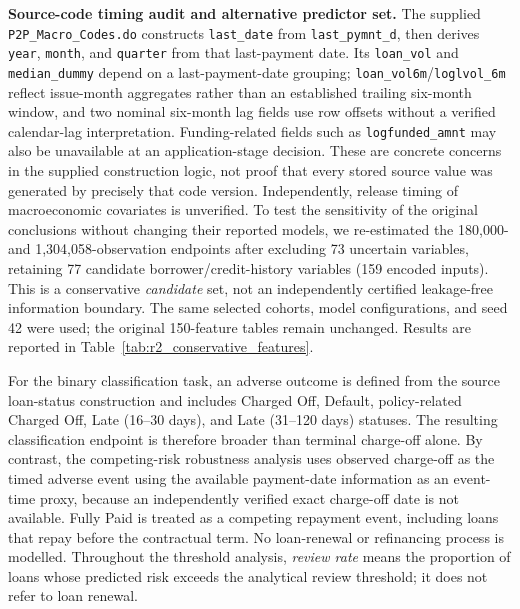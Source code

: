 \documentclass[10pt]{article}
\begin{document}
\noindent\textbf{Source-code timing audit and alternative predictor set.} The supplied \texttt{P2P\_Macro\_Codes.do} constructs \texttt{last\_date} from \texttt{last\_pymnt\_d}, then derives \texttt{year}, \texttt{month}, and \texttt{quarter} from that last-payment date. Its \texttt{loan\_vol} and \texttt{median\_dummy} depend on a last-payment-date grouping; \texttt{loan\_vol6m}/\texttt{loglvol\_6m} reflect issue-month aggregates rather than an established trailing six-month window, and two nominal six-month lag fields use row offsets without a verified calendar-lag interpretation. Funding-related fields such as \texttt{logfunded\_amnt} may also be unavailable at an application-stage decision. These are concrete concerns in the supplied construction logic, not proof that every stored source value was generated by precisely that code version. Independently, release timing of macroeconomic covariates is unverified. To test the sensitivity of the original conclusions without changing their reported models, we re-estimated the 180,000- and 1,304,058-observation endpoints after excluding 73 uncertain variables, retaining 77 candidate borrower/credit-history variables (159 encoded inputs). This is a conservative \emph{candidate} set, not an independently certified leakage-free information boundary. The same selected cohorts, model configurations, and seed 42 were used; the original 150-feature tables remain unchanged. Results are reported in Table~\ref{tab:r2_conservative_features}.


For the binary classification task, an adverse outcome is defined from the source loan-status construction and includes Charged Off, Default, policy-related Charged Off, Late (16--30 days), and Late (31--120 days) statuses. The resulting classification endpoint is therefore broader than terminal charge-off alone. By contrast, the competing-risk robustness analysis uses observed charge-off as the timed adverse event using the available payment-date information as an event-time proxy, because an independently verified exact charge-off date is not available. Fully Paid is treated as a competing repayment event, including loans that repay before the contractual term. No loan-renewal or refinancing process is modelled. Throughout the threshold analysis, \emph{review rate} means the proportion of loans whose predicted risk exceeds the analytical review threshold; it does not refer to loan renewal.
\end{document}
